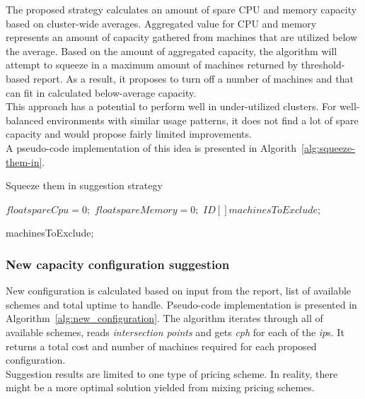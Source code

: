 \documentclass[]{final_report}
\begin{document}
The proposed strategy calculates an amount of spare CPU and memory capacity based on cluster-wide averages. Aggregated value for CPU and memory represents an amount of capacity gathered from machines that are utilized below the average. Based on the amount of aggregated capacity, the algorithm will attempt to squeeze in a maximum amount of machines returned by threshold-based report. As a result, it proposes to turn off a number of machines and that can fit in calculated below-average capacity. \\
This approach has a potential to perform well in under-utilized clusters. For well-balanced environments with similar usage patterns, it does not find a lot of spare capacity and would propose fairly limited improvements. \\
A pseudo-code implementation of this idea is presented in Algorith~\ref{alg:squeeze-them-in}.

\begin{algorithm}[h]
\caption{Squeeze them in suggestion strategy}
\label{alg:squeeze-them-in}
 \algrenewcommand{}
 \algrenewcommand{}

  $float spareCpu = 0;$
  $float spareMemory = 0;$
  $ID[ ] machinesToExclude;$



\Return machinesToExclude;

\end{algorithm}

\subsubsection{New capacity configuration suggestion}

New configuration is calculated based on input from the report, list of available schemes and total uptime to handle. Pseudo-code implementation is presented in Algorithm~\ref{alg:new_configuration}. The algorithm iterates through all of available schemes, reads \textit{intersection points} and gets \textit{cph} for each of the \textit{ip}s. It returns a total cost and number of machines required for each proposed configuration. \\
Suggestion results are limited to one type of pricing scheme. In reality, there might be a more optimal solution yielded from mixing pricing schemes. 
\end{document}
